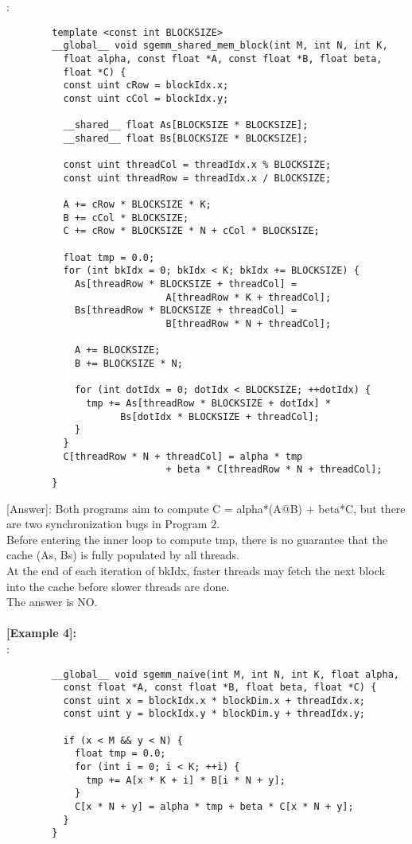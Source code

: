       \text{    [Program 2]}:\\
      \begin{lstlisting}
        template <const int BLOCKSIZE>
        __global__ void sgemm_shared_mem_block(int M, int N, int K,
          float alpha, const float *A, const float *B, float beta,
          float *C) {
          const uint cRow = blockIdx.x;
          const uint cCol = blockIdx.y;

          __shared__ float As[BLOCKSIZE * BLOCKSIZE];
          __shared__ float Bs[BLOCKSIZE * BLOCKSIZE];

          const uint threadCol = threadIdx.x % BLOCKSIZE;
          const uint threadRow = threadIdx.x / BLOCKSIZE;

          A += cRow * BLOCKSIZE * K;
          B += cCol * BLOCKSIZE;
          C += cRow * BLOCKSIZE * N + cCol * BLOCKSIZE;

          float tmp = 0.0;
          for (int bkIdx = 0; bkIdx < K; bkIdx += BLOCKSIZE) {
            As[threadRow * BLOCKSIZE + threadCol] =
                            A[threadRow * K + threadCol];
            Bs[threadRow * BLOCKSIZE + threadCol] =
                            B[threadRow * N + threadCol];

            A += BLOCKSIZE;
            B += BLOCKSIZE * N;

            for (int dotIdx = 0; dotIdx < BLOCKSIZE; ++dotIdx) {
              tmp += As[threadRow * BLOCKSIZE + dotIdx] *
                    Bs[dotIdx * BLOCKSIZE + threadCol];
            }
          }
          C[threadRow * N + threadCol] = alpha * tmp
                            + beta * C[threadRow * N + threadCol];
        }
      \end{lstlisting}
      [Answer]: Both programs aim to compute C = alpha*(A@B) + beta*C, but there are two synchronization bugs in Program 2.\\
                Before entering the inner loop to compute tmp, there is no guarantee that the cache (As, Bs) is fully populated by all threads.\\
                At the end of each iteration of bkIdx, faster threads may fetch the next block into the cache before slower threads are done.\\
                The answer is NO.\\
\\
\noindent\textbf{[Example 4]:}\\
      \text{    [Program 1]}:\\
      \begin{lstlisting}
        __global__ void sgemm_naive(int M, int N, int K, float alpha,
          const float *A, const float *B, float beta, float *C) {
          const uint x = blockIdx.x * blockDim.x + threadIdx.x;
          const uint y = blockIdx.y * blockDim.y + threadIdx.y;

          if (x < M && y < N) {
            float tmp = 0.0;
            for (int i = 0; i < K; ++i) {
              tmp += A[x * K + i] * B[i * N + y];
            }
            C[x * N + y] = alpha * tmp + beta * C[x * N + y];
          }
        }
      \end{lstlisting}
